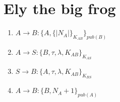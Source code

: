 \section{Ely the big frog}

\begin{enumerate}
    \item $A \rightarrow B : \{A, \{|N_A|\}_{K_{AB}}\}_{pub(B)}$
    \item $A \rightarrow S : \{B, \tau, \lambda, K_{AB}\}_{K_{AS}}$
    \item $S \rightarrow B : \{A, \tau, \lambda, K_{AB}\}_{K_{BS}}$
    \item $A \rightarrow B : \{B, N_A+1\}_{pub(A)}$
\end{enumerate}